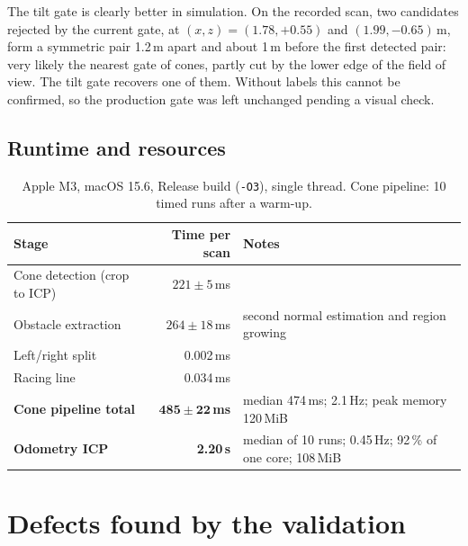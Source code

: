 \documentclass[10pt,a4paper]{scrartcl}
\newcommand{\code}[1]{\texttt{#1}}
\newcommand{\RuleSection}[1]{%
    \section{#1}%
    \vspace{0.2em}{\color{accent!35}\hrule height 0.4pt}\vspace{0.3em}%
  }
\begin{document}
  The tilt gate is clearly better in simulation. On the recorded scan, two candidates rejected
  by the current gate, at $(x,z)=(1.78,+0.55)$ and $(1.99,-0.65)$\,m, form a symmetric pair
  1.2\,m apart and about 1\,m before the first detected pair: very likely the nearest gate of
  cones, partly cut by the lower edge of the field of view. The tilt gate recovers one of them.
  Without labels this cannot be confirmed, so the production gate was left unchanged pending a
  visual check.

  \subsection{Runtime and resources}

  \begin{table}[htbp]
  \small
  \centering
  \begin{tabular}{@{}lrl@{}}
  \toprule
  \textbf{Stage} & \textbf{Time per scan} & \textbf{Notes} \\
  \midrule
  Cone detection (crop to ICP) & $221\pm5$\,ms & \\
  Obstacle extraction & $264\pm18$\,ms & second normal estimation and region growing \\
  Left/right split & 0.002\,ms & \\
  Racing line & 0.034\,ms & \\
  \textbf{Cone pipeline total} & $\bm{485\pm22}$\,\textbf{ms} & median 474\,ms; 2.1\,Hz; peak memory 120\,MiB \\
  \textbf{Odometry ICP} & \textbf{2.20\,s} & median of 10 runs; 0.45\,Hz; 92\,\% of one core; 108\,MiB \\
  \bottomrule
  \end{tabular}
  \caption{Apple M3, macOS 15.6, Release build (\code{-O3}), single thread. Cone pipeline: 10
  timed runs after a warm-up.}
  \label{tab:runtime}
  \end{table}

  \RuleSection{Defects found by the validation}
  \label{sec:fixes}
\end{document}
